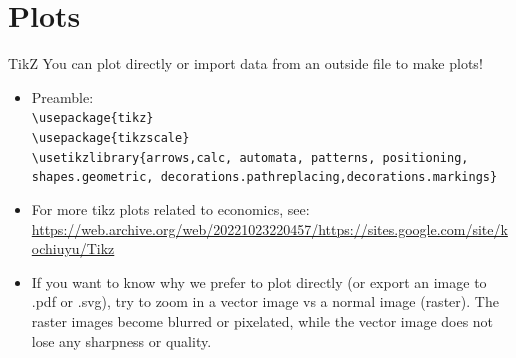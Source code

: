 \documentclass[
11pt, %
]{beamer}
\begin{document}
	\section{Plots}
	\begin{frame}{TikZ}
		You can plot directly or import data from an outside file to make plots!
		
		\begin{itemize}
		\item Preamble: \\
		
		\texttt{\textbackslash usepackage\{tikz\} } \\
		\texttt{\textbackslash usepackage\{tikzscale\}} \\
		\texttt{\textbackslash usetikzlibrary\{arrows,calc, automata, patterns, positioning, shapes.geometric, decorations.pathreplacing,decorations.markings\}}
		
		\item For more tikz plots related to economics, see:
		\url{https://web.archive.org/web/20221023220457/https://sites.google.com/site/kochiuyu/Tikz}
		
		\item If you want to know why we prefer to plot directly (or export an image to .pdf or .svg), try to zoom in a vector image vs a normal image (raster). The raster images become blurred or pixelated, while the vector image does not lose any sharpness or quality. 
		\end{itemize}
	\end{frame}
	
\end{document}
